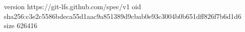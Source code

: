 version https://git-lfs.github.com/spec/v1
oid sha256:c3e2c5586bdeca55d1aac9a851389d9cbab0e93c3004b0b651dff826f7b6d1d6
size 626416
